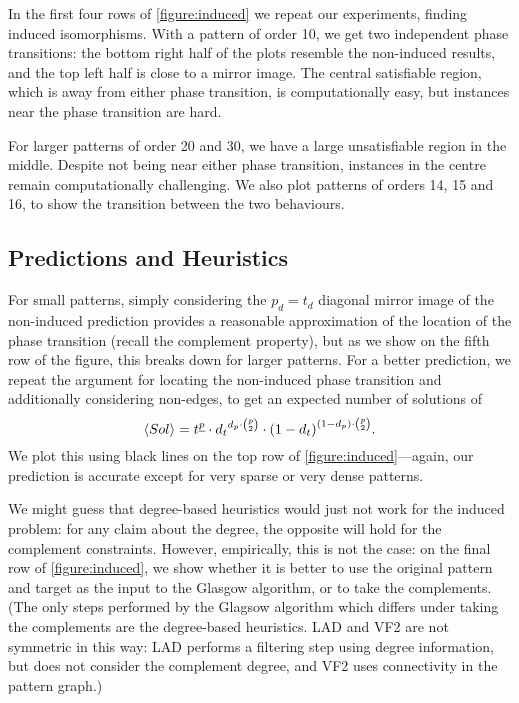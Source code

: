 \documentclass[letterpaper]{article}
\begin{document}
In the first four rows of \cref{figure:induced} we repeat our experiments, finding induced
isomorphisms. With a pattern of order 10, we get two independent phase transitions: the bottom right
half of the plots resemble the non-induced results, and the top left half is close to a mirror
image. The central satisfiable region, which is away from either phase transition, is
computationally easy, but instances near the phase transition are hard.

For larger patterns of order 20 and 30, we have a large unsatisfiable region in the middle. Despite
not being near either phase transition, instances in the centre remain computationally challenging.
We also plot patterns of orders 14, 15 and 16, to show the transition between the two behaviours.

\subsection{Predictions and Heuristics}

For small patterns, simply considering the $p_d=t_d$ diagonal mirror image of the non-induced
prediction provides a reasonable approximation of the location of the phase transition (recall the
complement property), but as we show on the fifth row of the figure, this breaks down for larger
patterns. For a better prediction, we repeat the argument for locating the non-induced phase
transition and additionally considering non-edges, to get an expected number of solutions of \[
\langle Sol \rangle = t^{\underline{p}} \cdot {d_t}^{d_p \cdot \binom{p}{2}} \cdot {(1 -
d_{t})}^{(1 - d_{p}) \cdot \binom{p}{2}} \textnormal{.} \] We plot this using black lines on the top
row of \cref{figure:induced}---again, our prediction is accurate except for very sparse or very
dense patterns.

We might guess that degree-based heuristics would just not work for the induced problem: for any
claim about the degree, the opposite will hold for the complement constraints. However, empirically,
this is not the case: on the final row of \cref{figure:induced}, we show whether it is better to use
the original pattern and target as the input to the Glasgow algorithm, or to take the complements.
(The only steps performed by the Glagsow algorithm which differs under taking the complements are
the degree-based heuristics.  LAD and VF2 are not symmetric in this way: LAD performs a filtering
step using degree information, but does not consider the complement degree, and VF2 uses
connectivity in the pattern graph.)
\end{document}
